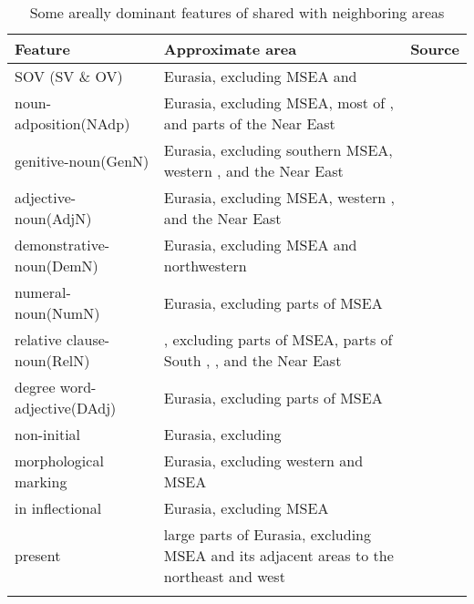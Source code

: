 \begin{table}
\caption{Some areally dominant features of  shared with neighboring areas}
\label{tab:3:1}

\begin{tabularx}{\textwidth}{>{\raggedright}p{35mm}Qp{2cm}}
\lsptoprule

\textbf{Feature} & \textbf{Approximate area} & \textbf{Source}\\
\midrule
SOV (SV \& OV) & Eurasia, excluding MSEA and  & \citealt{Dryer2013c}\\
\tablevspace
noun-adposition\newline (NAdp) & Eurasia, excluding MSEA, most of , and parts of the Near East & \citealt{Dryer2013d}\\
\tablevspace
genitive-noun\newline (GenN) & Eurasia, excluding southern MSEA, western , and the Near East & \citealt{Dryer2013e}\\
\tablevspace
adjective-noun\newline (AdjN) & Eurasia, excluding MSEA, western , and the Near East & \citealt{Dryer2013f}\\
\tablevspace
demonstrative-noun\newline (DemN) & Eurasia, excluding MSEA and northwestern  & \citealt{Dryer2013g}\\
\tablevspace
numeral-noun\newline (NumN) & Eurasia, excluding parts of MSEA & \citealt{Dryer2013h}\\
\tablevspace
relative clause-noun\newline (RelN) & , excluding parts of MSEA, parts of South , , and the Near East & \citealt{Dryer2013i}\\
\tablevspace
degree word-adjective\newline (DAdj) & Eurasia, excluding parts of MSEA & \citealt{Dryer2013j}\\
\tablevspace
non-initial  & Eurasia, excluding  & \citealt{Dryer2013l}\\
\tablevspace
morphological  marking & Eurasia, excluding western  and MSEA & \citealt{Iggesen2013}\\
\tablevspace
{} in inflectional  & Eurasia, excluding MSEA & \citealt{Dryer2013b}\\
\tablevspace
{} present & large parts of Eurasia, excluding MSEA and its adjacent areas to the northeast and west & \citealt{NicholsPeterson2013}\\
\lspbottomrule
\end{tabularx}
\end{table}

